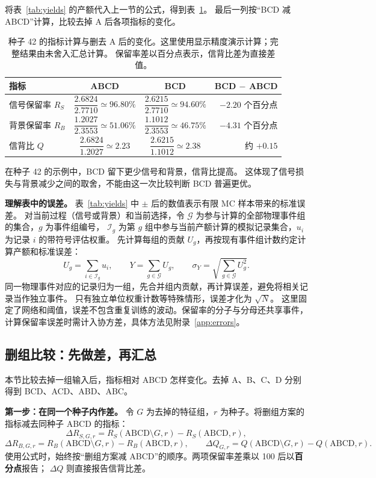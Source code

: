 \documentclass[11pt,a4paper,fontset=fandol,scheme=plain]{ctexart}
\begin{document}
将表~\ref{tab:yields} 的产额代入上一节的公式，得到表~\ref{tab:worked-metrics}。
最后一列按“BCD 减 ABCD”计算，比较去掉 A 后各项指标的变化。
\begin{table}[H]
\caption{种子 42 的指标计算与删去 A 后的变化。这里使用显示精度演示计算；完整结果由未舍入汇总计算。
保留率差以百分点表示，信背比差为直接差值。}
\label{tab:worked-metrics}
\centering\small
\renewcommand{\arraystretch}{2.6}
\begin{tabular}{lccr}
\toprule
指标 & ABCD & BCD & BCD $-$ ABCD \\
\midrule
信号保留率 $R_S$ & $\dfrac{2.6824}{2.7710}\simeq96.80\%$ & $\dfrac{2.6215}{2.7710}\simeq94.60\%$ & $-2.20$ 个百分点 \\
背景保留率 $R_B$ & $\dfrac{1.2027}{2.3553}\simeq51.06\%$ & $\dfrac{1.1012}{2.3553}\simeq46.75\%$ & $-4.31$ 个百分点 \\
信背比 $Q$ & $\dfrac{2.6824}{1.2027}\simeq2.23$ & $\dfrac{2.6215}{1.1012}\simeq2.38$ & 约 $+0.15$ \\
\bottomrule
\end{tabular}
\end{table}
在种子 42 的示例中，BCD 留下更少信号和背景，信背比提高。
这体现了信号损失与背景减少之间的取舍，不能由这一次比较判断 BCD 普遍更优。

\textbf{理解表中的误差。}
表~\ref{tab:yields} 中 $\pm$ 后的数值表示有限 MC 样本带来的标准误差。
对当前过程（信号或背景）和当前选择，令 $\mathcal G$ 为参与计算的全部物理事件组的集合，$g$ 为事件组编号，
$\mathcal I_g$ 为第 $g$ 组中参与当前产额计算的模拟记录集合，$u_i$ 为记录 $i$ 的带符号评估权重。
先计算每组的贡献 $U_g$，再按现有事件组计数约定计算产额和标准误差：
\[
 U_g=\sum_{i\in\mathcal I_g}u_i,\qquad
 Y=\sum_{g\in\mathcal G}U_g,\qquad
 \sigma_Y=\sqrt{\sum_{g\in\mathcal G}U_g^2}.
\]
同一物理事件对应的记录归为一组，先合并组内贡献，再计算误差，避免将相关记录当作独立事件。
只有独立单位权重计数等特殊情形，误差才化为 $\sqrt{N}$。
这里固定了网络和阈值，误差不包含重复训练的波动。保留率的分子与分母还共享事件，
计算保留率误差时需计入协方差，具体方法见附录~\ref{app:errors}。


\subsection{删组比较：先做差，再汇总}
本节比较去掉一组输入后，指标相对 ABCD 怎样变化。去掉 A、B、C、D 分别得到 BCD、ACD、ABD、ABC。

\textbf{第一步：在同一个种子内作差。}
令 $G$ 为去掉的特征组，$r$ 为种子。将删组方案的指标减去同种子 ABCD 的指标：
\[
 \Delta R_{S,G,r}=R_S(\mathrm{ABCD}\setminus G,r)-R_S(\mathrm{ABCD},r),
\]
\[
 \Delta R_{B,G,r}=R_B(\mathrm{ABCD}\setminus G,r)-R_B(\mathrm{ABCD},r),\qquad
 \Delta Q_{G,r}=Q(\mathrm{ABCD}\setminus G,r)-Q(\mathrm{ABCD},r).
\]
使用公式时，始终按“删组方案减 ABCD”的顺序。两项保留率差乘以 100 后以\textbf{百分点}报告；
$\Delta Q$ 则直接报告信背比差。
\end{document}
